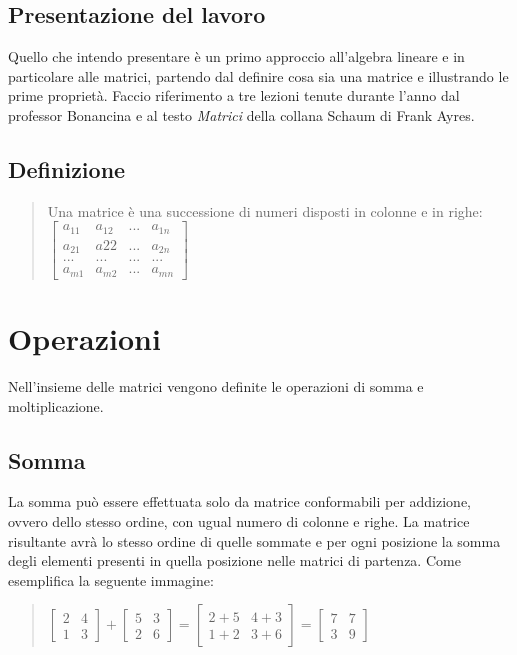 \documentclass[a4paper]{article}
\begin{document}
\subsection{Presentazione del lavoro}
Quello che intendo presentare è un primo approccio all’algebra lineare e in particolare alle matrici, partendo dal definire cosa sia una matrice e illustrando le prime proprietà. Faccio riferimento a tre lezioni tenute durante l’anno dal professor Bonancina e al testo {\it Matrici} della collana Schaum di Frank Ayres.

\subsection{Definizione}

\vspace*{\fill} 
\begin{quote} 
\centering 
Una matrice è una successione di numeri disposti in colonne e in righe:
\bigskip \\
$\left[\begin{matrix}a_{11} & a_{12} & ... & a_{1n} \\ a_{21} & a{22} & ... & a_{2n} \\ ... & ... & ... & ...\\ a_{m1} & a_{m2} & ... & a_{mn}\end{matrix}\right]
$
\end{quote}
\vspace*{\fill}

\section{Operazioni}
Nell'insieme delle matrici vengono definite le operazioni di somma e moltiplicazione.

\subsection{Somma}
La somma può essere effettuata solo da matrice conformabili per addizione, ovvero dello stesso ordine, con ugual numero di colonne e righe. La matrice risultante avrà lo stesso ordine di quelle sommate e per ogni posizione la somma degli elementi presenti in quella posizione nelle matrici di partenza. Come esemplifica la seguente immagine:
\\
\begin{quote} \centering $\left[\begin{matrix}2 & 4 \\ 1 & 3\end{matrix}\right] + \left[\begin{matrix}5 & 3 \\ 2 & 6\end{matrix}\right] = \left[\begin{matrix} 2+5 & 4+3 \\ 1+2 & 3+6\end{matrix}\right] = \left[\begin{matrix}7 & 7 \\ 3 & 9\end{matrix}\right]
$\end{quote}
\end{document}
